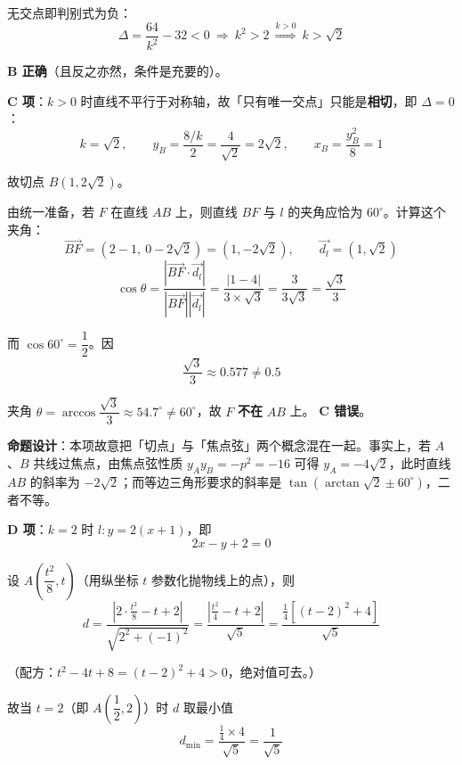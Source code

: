 \begin{answer}
无交点即判别式为负：
\nopagebreak[4]
\[\Delta=\frac{64}{k^2}-32<0\ \Longrightarrow\ k^2>2\ \overset{k>0}{\Longrightarrow}\ k>\sqrt2\]

 \textbf{B 正确}（且反之亦然，条件是充要的）。

\par\medskip

\textbf{C 项}：$k>0$ 时直线不平行于对称轴，故「只有唯一交点」只能是\textbf{相切}，即 $\Delta=0$：
\nopagebreak[4]
\[k=\sqrt2,\qquad y_B=\frac{8/k}{2}=\frac{4}{\sqrt2}=2\sqrt2,\qquad x_B=\frac{y_B^2}{8}=1\]

故切点 $B\left(1,2\sqrt2\right)$。

由统一准备，若 $F$ 在直线 $AB$ 上，则直线 $BF$ 与 $l$ 的夹角应恰为 $60^\circ$。计算这个夹角：
\nopagebreak[4]
\[\overrightarrow{BF}=(2-1,\ 0-2\sqrt2)=\left(1,-2\sqrt2\right),\qquad \vec{d_l}=\left(1,\sqrt2\right)\]
\nopagebreak[4]
\[\cos\theta=\frac{\left|\overrightarrow{BF}\cdot\vec{d_l}\right|}{\left|\overrightarrow{BF}\right|\left|\vec{d_l}\right|}=\frac{\left|1-4\right|}{3\times\sqrt3}=\frac{3}{3\sqrt3}=\frac{\sqrt3}{3}\]

而 $\cos60^\circ=\dfrac12$。因
\nopagebreak[4]
\[\frac{\sqrt3}{3}\approx0.577\ne0.5\]

夹角 $\theta=\arccos\dfrac{\sqrt3}{3}\approx54.7^\circ\ne60^\circ$，故 $F$ \textbf{不在} $AB$ 上。 \textbf{C 错误}。

\begin{gktip}
\textbf{命题设计}：本项故意把「切点」与「焦点弦」两个概念混在一起。事实上，若 $A$、$B$ 共线过焦点，由焦点弦性质 $y_Ay_B=-p^2=-16$ 可得 $y_A=-4\sqrt2$，此时直线 $AB$ 的斜率为 $-2\sqrt2$；而等边三角形要求的斜率是 $\tan\left(\arctan\sqrt2\pm60^\circ\right)$，二者不等。
\end{gktip}

\par\medskip

\textbf{D 项}：$k=2$ 时 $l:y=2(x+1)$，即
\nopagebreak[4]
\[2x-y+2=0\]

设 $A\left(\dfrac{t^2}{8},t\right)$（用纵坐标 $t$ 参数化抛物线上的点），则
\nopagebreak[4]
\[d=\frac{\left|2\cdot\frac{t^2}{8}-t+2\right|}{\sqrt{2^2+(-1)^2}}=\frac{\left|\frac{t^2}{4}-t+2\right|}{\sqrt5}=\frac{\frac14\left[(t-2)^2+4\right]}{\sqrt5}\]

（配方：$t^2-4t+8=(t-2)^2+4>0$，绝对值可去。）

故当 $t=2$（即 $A\left(\dfrac12,2\right)$）时 $d$ 取最小值
\nopagebreak[4]
\[d_{\min}=\frac{\frac14\times4}{\sqrt5}=\frac{1}{\sqrt5}\]


\end{answer}
